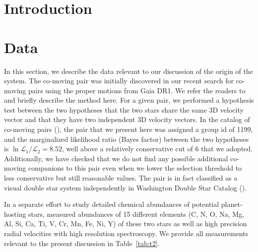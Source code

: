 \documentclass[manuscript]{aastex6}
\newcommand*\elem[1]{\ensuremath{\mathrm{#1}}}
\begin{document}
\section{Introduction} %
\label{sec:introduction}


\section{Data}
\label{sec:data}

In this section, we describe the data relevant to our discussion of the origin of the system.
The co-moving pair was initially discovered in our recent search
for co-moving pairs using the proper motions from Gaia DR1.
We refer the readers to \citealt{2016arXiv161202440O} and briefly describe the method here.
For a given pair, we performed a hypothesis test between the two hypotheses that
the two stars share the same 3D velocity vector and that they have
two independent 3D velocity vectors.
In the catalog of co-moving pairs (\citealt{2016arXiv161202440O}),
the pair that we present here was assigned a group id of 1199,
and the marginalized likelihood ratio (Bayes factor)
between the two hypotheses is $\ln{\mathcal{L}_1/\mathcal{L}_2} = 8.52$,
well above a relatively conservative cut of 6 that we adopted.
Additionally, we have checked that we do not find any possible additional co-moving companions
to this pair even when we lower the selection threshold to less conservative but still reasonable values.
The pair is in fact classified as a visual double star system independently
in Washington Double Star Catalog (\cite{2001AJ....122.3466M}).

In a separate effort to study detailed chemical abundances of
potential planet-hosting stars, \citet{2016ApJS..225...32B}
measured abundances of 15 different elements
(C, N, O, Na, Mg, Al, Si, Ca, Ti, V, Cr, Mn, Fe, Ni, Y)
of these two stars as well as high precision radial velocities
with high resolution spectroscopy.
We provide all measurements relevant to the present discussion in Table~\ref{tab:t2}.

\end{document}
